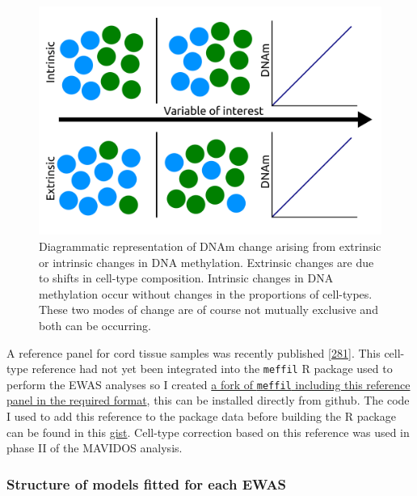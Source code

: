 \documentclass[
]{book}
\begin{document}
\begin{figure}

{\centering \includegraphics[width=0.8\linewidth]{figs/IntrinsicVsExtrinsicDNAmChangeGeneral} 

}

\caption{Diagrammatic representation of DNAm change arising from extrinsic or intrinsic changes in DNA methylation. Extrinsic changes are due to shifts in cell-type composition. Intrinsic changes in DNA methylation occur without changes in the proportions of cell-types. These two modes of change are of course not mutually exclusive and both can be occurring.}\label{fig:IntrinsicVsExtrinsicDNAmChangeGeneral}
\end{figure}



A reference panel for cord tissue samples was recently published {[}\protect\hyperlink{ref-Lin2018}{281}{]}.
This cell-type reference had not yet been integrated into the \texttt{meffil} R package used to perform the EWAS analyses so I created \href{https://github.com/RichardJActon/meffil/blob/LinAndKarnaniCordTissueRef/data-raw/lin-karnani-reference.r}{a fork of \texttt{meffil} including this reference panel in the required format}, this can be installed directly from github.
The code I used to add this reference to the package data before building the R package can be found in this \href{https://gist.github.com/RichardJActon/703ae70438e865a37998cd608bd12cd3}{gist}.
Cell-type correction based on this reference was used in phase II of the MAVIDOS analysis.

\hypertarget{structure-of-models-fitted-for-each-ewas}{%
\subsubsection{Structure of models fitted for each EWAS}\label{structure-of-models-fitted-for-each-ewas}}
\end{document}
